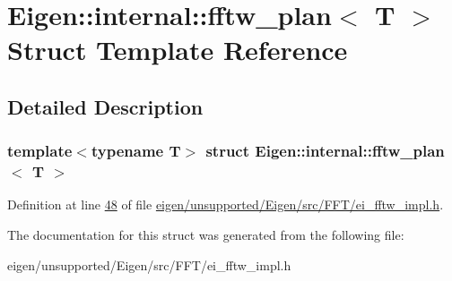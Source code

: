 \hypertarget{struct_eigen_1_1internal_1_1fftw__plan}{}\section{Eigen\+:\+:internal\+:\+:fftw\+\_\+plan$<$ T $>$ Struct Template Reference}
\label{struct_eigen_1_1internal_1_1fftw__plan}


\subsection{Detailed Description}
\subsubsection*{template$<$typename T$>$\newline
struct Eigen\+::internal\+::fftw\+\_\+plan$<$ T $>$}



Definition at line \hyperlink{eigen_2unsupported_2_eigen_2src_2_f_f_t_2ei__fftw__impl_8h_source_l00048}{48} of file \hyperlink{eigen_2unsupported_2_eigen_2src_2_f_f_t_2ei__fftw__impl_8h_source}{eigen/unsupported/\+Eigen/src/\+F\+F\+T/ei\+\_\+fftw\+\_\+impl.\+h}.



The documentation for this struct was generated from the following file\+:\begin{DoxyCompactItemize}
\item 
eigen/unsupported/\+Eigen/src/\+F\+F\+T/ei\+\_\+fftw\+\_\+impl.\+h\end{DoxyCompactItemize}
